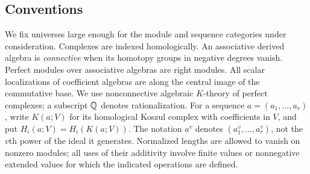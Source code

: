 \subsection{Conventions}

We fix universes large enough for the module and sequence categories
under consideration.
Complexes are indexed homologically. An associative derived algebra is
\emph{connective} when its homotopy groups in negative degrees vanish.
Perfect modules over associative algebras are right modules.
All scalar localizations of coefficient algebras are along the central
image of the commutative base. We use nonconnective algebraic
$K$-theory of perfect complexes; a subscript $\mathbb{Q}$ denotes rationalization.
For a sequence $a=(a_1,\ldots,a_r)$, write $K(a;V)$ for its homological
Koszul complex with coefficients in $V$, and put
$H_i(a;V)=H_i(K(a;V))$. The notation $a^v$ denotes
$(a_1^v,\ldots,a_r^v)$, not the $v$th power of the ideal it generates.
Normalized lengths are allowed to vanish on nonzero modules; all uses
of their additivity involve finite values or nonnegative extended
values for which the indicated operations are defined.
